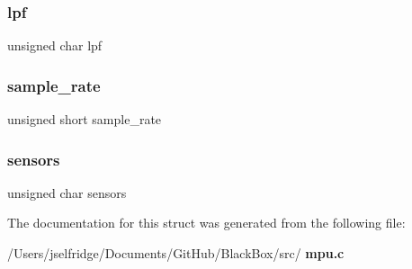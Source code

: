 \subsubsection{lpf}
{\footnotesize\ttfamily unsigned char lpf}

\mbox{\label{structchip__cfg__s_a1aa4e026c4d2f691506f2d713a405aea}} 
\subsubsection{sample\+\_\+rate}
{\footnotesize\ttfamily unsigned short sample\+\_\+rate}

\mbox{\label{structchip__cfg__s_aaa21c01566947e7007476657cb614e3f}} 
\subsubsection{sensors}
{\footnotesize\ttfamily unsigned char sensors}



The documentation for this struct was generated from the following file\+:\begin{DoxyCompactItemize}
\item 
/\+Users/jselfridge/\+Documents/\+Git\+Hub/\+Black\+Box/src/\textbf{ mpu.\+c}\end{DoxyCompactItemize}
